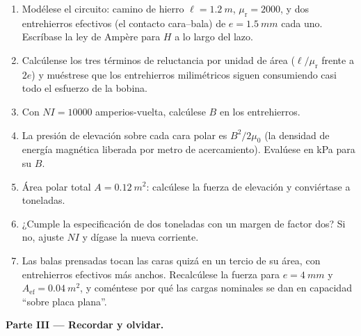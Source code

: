 \begin{problem}
\begin{enumerate}[resume]
  \item Modélese el circuito: camino de hierro $\ell = \qty{1.2}{m}$,
        $\mu_{\text{r}} = 2000$, y dos entrehierros efectivos
        (el contacto cara--bala) de $e = \qty{1.5}{mm}$ cada uno. Escríbase
        la ley de Ampère para $H$ a lo largo del lazo.
  \item Calcúlense los tres términos de reluctancia por unidad de área
        ($\ell/\mu_{\text{r}}$ frente a $2e$) y muéstrese que los
        entrehierros milimétricos siguen consumiendo casi todo el esfuerzo de la bobina.
  \item Con $NI = \num{10000}$ amperios-vuelta, calcúlese $B$ en los
        entrehierros.
  \item La presión de elevación sobre cada cara polar es $B^2/2\mu_0$
        (la densidad de energía magnética liberada por metro de acercamiento).
        Evalúese en \unit{kPa} para su $B$.
  \item Área polar total $A = \qty{0.12}{m^2}$: calcúlese la
        fuerza de elevación y conviértase a toneladas.
  \item ¿Cumple la especificación de dos toneladas con un margen de factor
        dos? Si no, ajuste $NI$ y dígase la nueva corriente.
  \item Las balas prensadas tocan las caras quizá en un tercio de su
        área, con entrehierros efectivos más anchos. Recalcúlese la fuerza para
        $e = \qty{4}{mm}$ y $A_{\text{ef}} = \qty{0.04}{m^2}$, y
        coméntese por qué las cargas nominales se dan en capacidad ``sobre placa plana''.
\end{enumerate}

\medskip\noindent\textbf{Parte III --- Recordar y olvidar.}


\end{problem}
